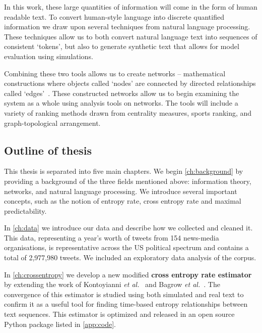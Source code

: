 In this work, these large quantities of information will come in the form of human readable text. To convert human-style language into discrete quantified information we draw upon several techniques from natural language processing. These techniques allow us to both convert natural language text into sequences of consistent `tokens', but also to generate synthetic text that allows for model evaluation using simulations. 

Combining these two tools allows us to create networks -- mathematical constructions where objects called `nodes' are connected by directed relationships called `edges'~\cite{newman_networks_2018}. These constructed networks allow us to begin examining the system as a whole using analysis tools on networks. The tools will include a variety of ranking methods drawn from centrality measures, sports ranking, and graph-topological arrangement.


\subsection{Outline of thesis}



This thesis is separated into five main chapters. We begin \autoref{ch:background} by providing a background of the three fields mentioned above: information theory, networks, and natural language processing. We introduce several important concepts, such as the notion of entropy rate, cross entropy rate and maximal predictability.

In \autoref{ch:data} we introduce our data and describe how we collected and cleaned it. This data, representing a year's worth of tweets from 154 news-media organisations, is representative across the US political spectrum and contains a total of 2,977,980 tweets. We included an exploratory data analysis of the corpus.

In \autoref{ch:crossentropy} we develop a new modified \textbf{cross entropy rate estimator} by extending the work of Kontoyianni \emph{et al.}~\cite{kontoyiannis_nonparametric_1998} and Bagrow \emph{et al.}~\cite{bagrowInformationFlowReveals2019}. The convergence of this estimator is studied using both simulated and real text to confirm it as a useful tool for finding time-based entropy relationships between text sequences. This estimator is optimized and released in an open source Python package listed in \autoref{app:code}.

